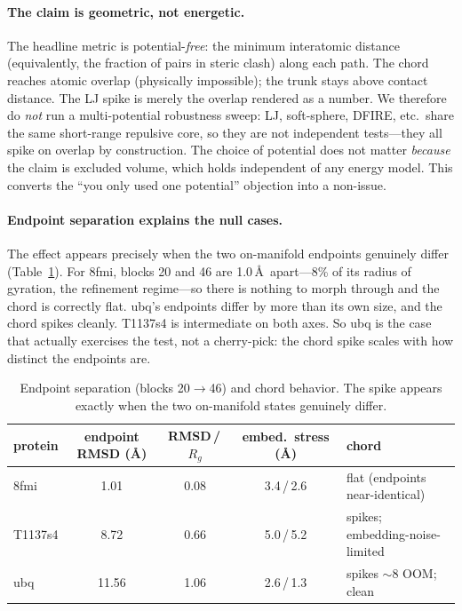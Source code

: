 \documentclass[11pt]{article}
\begin{document}
\paragraph{The claim is geometric, not energetic.}
The headline metric is potential-\emph{free}: the minimum interatomic distance
(equivalently, the fraction of pairs in steric clash) along each path. The chord
reaches atomic overlap (physically impossible); the trunk stays above contact
distance. The LJ spike is merely the overlap rendered as a number. We therefore do
\emph{not} run a multi-potential robustness sweep: LJ, soft-sphere, DFIRE, etc.\
share the same short-range repulsive core, so they are not independent tests---they
all spike on overlap by construction. The choice of potential does not matter
\emph{because} the claim is excluded volume, which holds independent of any energy
model. This converts the ``you only used one potential'' objection into a non-issue.

\paragraph{Endpoint separation explains the null cases.}
The effect appears precisely when the two on-manifold endpoints genuinely differ
(Table~\ref{tab:rmsd}). For 8fmi, blocks 20 and 46 are 1.0\,\AA\ apart---8\% of
its radius of gyration, the refinement regime---so there is nothing to morph
through and the chord is correctly flat. ubq's endpoints differ by more than its
own size, and the chord spikes cleanly. T1137s4 is intermediate on both axes. So
ubq is the case that actually exercises the test, not a cherry-pick: the chord
spike scales with how distinct the endpoints are.

\begin{table}[t]\centering
\caption{Endpoint separation (blocks 20$\to$46) and chord behavior. The spike
appears exactly when the two on-manifold states genuinely differ.}
\label{tab:rmsd}
\begin{tabular}{lcccl}
\toprule
protein & endpoint RMSD (\AA) & RMSD\,/\,$R_g$ & embed.\ stress (\AA) & chord \\
\midrule
8fmi    & 1.01  & 0.08 & 3.4\,/\,2.6 & flat (endpoints near-identical) \\
T1137s4 & 8.72  & 0.66 & 5.0\,/\,5.2 & spikes; embedding-noise-limited \\
ubq     & 11.56 & 1.06 & 2.6\,/\,1.3 & spikes $\sim$8 OOM; clean \\
\bottomrule
\end{tabular}
\end{table}
\end{document}
